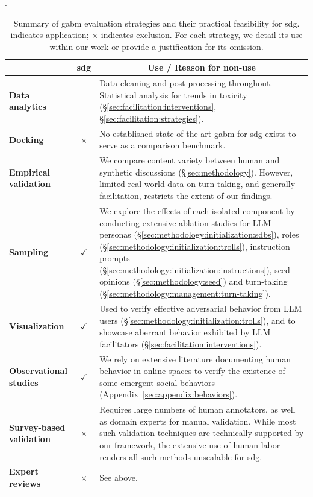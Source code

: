 \begin{table}[h	t]
	\centering
	\small
	\caption{Summary of \ac{gabm} evaluation strategies and their practical feasibility for \ac{sdg}. \checkmark indicates application; $\times$ indicates exclusion. For each strategy, we detail its use within our work or provide a justification for its omission.}.
	\label{tab:evaluation_sdg}
	\begin{tabular}{>{\bfseries}p{4cm} c p{8cm}}
		\toprule
		\multicolumn{1}{c}{\textbf{Name}} & 
		\multicolumn{1}{c}{\textbf{\ac{sdg}}} &
		\multicolumn{1}{c}{\textbf{Use / Reason for non-use}} \\
		\midrule
		Data analytics  & \checkmark & Data cleaning and post-processing throughout. Statistical analysis for trends in toxicity (\S\ref{sec:facilitation:interventions}, \S\ref{sec:facilitation:strategies}). \\
		
		Docking & $\times$  & No established state-of-the-art \ac{gabm} for \ac{sdg} exists to serve as a comparison benchmark. \\
		
		Empirical validation  & \checkmark&  We compare content variety between human and synthetic discussions (\S\ref{sec:methodology}). However, limited real-world data on turn taking, and generally facilitation, restricts the extent of our findings.\\
		
		Sampling  & $\checkmark$ & We explore the effects of each isolated component by conducting extensive ablation studies for LLM personas (\S\ref{sec:methodology:initialization:sdbs}), roles (\S\ref{sec:methodology:initialization:trolls}), instruction prompts (\S\ref{sec:methodology:initialization:instructions}), seed opinions (\S\ref{sec:methodology:seed}) and turn-taking (\S\ref{sec:methodology:management:turn-taking}). \\
		
		Visualization & $\checkmark$  & Used to verify effective adversarial behavior from LLM users (\S\ref{sec:methodology:initialization:trolls}), and to showcase aberrant behavior exhibited by LLM facilitators (\S\ref{sec:facilitation:interventions}). \\
		
		Observational studies  & $\checkmark$  & We rely on extensive literature documenting human behavior in online spaces to verify the existence of some emergent social behaviors (Appendix~\ref{sec:appendix:behaviors}).\\
		
		Survey-based validation & $\times$  & Requires large numbers of human annotators, as well as domain experts for manual validation. While most such validation techniques are technically supported by our framework, the extensive use of human labor renders all such methods unscalable for \ac{sdg}. \\
		Expert reviews & $\times$  & See above. \\
		
		\bottomrule
	\end{tabular}
\end{table}

